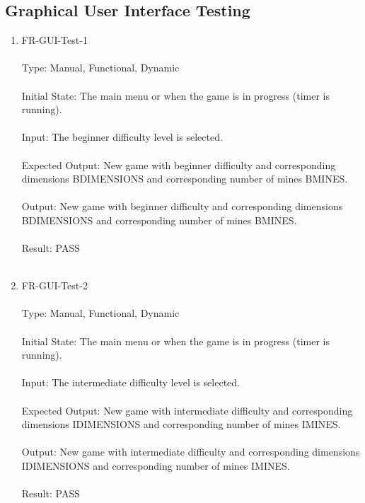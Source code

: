 \documentclass[12pt, titlepage]{article}
\begin{document}
\subsection{Graphical User Interface Testing}
\begin{enumerate}
\item{FR-GUI-Test-1\\\\}
Type: Manual, Functional, Dynamic\\\\
Initial State: The main menu or when the game is in progress (timer is running).\\\\
Input: The beginner difficulty level is selected.\\\\
Expected Output: New game with beginner difficulty and corresponding dimensions BDIMENSIONS and
corresponding number of mines BMINES.\\\\
Output: New game with beginner difficulty and corresponding dimensions BDIMENSIONS and
corresponding number of mines BMINES.\\\\
Result: PASS\\\\

\newpage
\item{FR-GUI-Test-2\\\\}
Type: Manual, Functional, Dynamic\\\\			
Initial State: The main menu or when the game is in progress (timer is running).\\\\
Input: The intermediate difficulty level is selected.\\\\		
Expected Output: New game with intermediate difficulty and corresponding dimensions IDIMENSIONS and 
corresponding number of mines IMINES.\\\\
Output: New game with intermediate difficulty and corresponding dimensions IDIMENSIONS and
corresponding number of mines IMINES.\\\\
Result: PASS\\\\


\end{enumerate}
\end{document}

